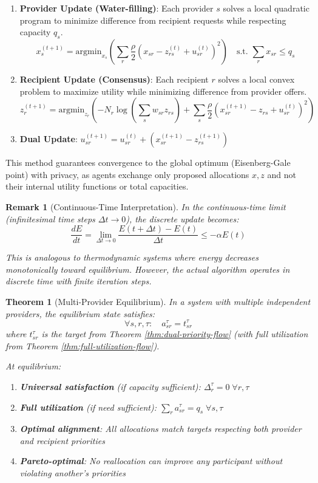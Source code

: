 \documentclass[11pt]{article}
\newtheorem{theorem}{Theorem}
\newtheorem{remark}{Remark}
\begin{document}
\begin{enumerate}
    \item \textbf{Provider Update (Water-filling)}: Each provider $s$ solves a local quadratic program to minimize difference from recipient requests while respecting capacity $q_s$.
    \[
    x_{s}^{(t+1)} = \text{argmin}_{x_s} \left( \sum_r \frac{\rho}{2} (x_{sr} - z_{rs}^{(t)} + u_{sr}^{(t)})^2 \right) \quad \text{s.t. } \sum_r x_{sr} \le q_s
    \]
    
    \item \textbf{Recipient Update (Consensus)}: Each recipient $r$ solves a local convex problem to maximize utility while minimizing difference from provider offers.
    \[
    z_{r}^{(t+1)} = \text{argmin}_{z_r} \left( -N_r \log(\sum_s w_{sr} z_{rs}) + \sum_s \frac{\rho}{2} (x_{sr}^{(t+1)} - z_{rs} + u_{sr}^{(t)})^2 \right)
    \]

    \item \textbf{Dual Update}: $u_{sr}^{(t+1)} = u_{sr}^{(t)} + (x_{sr}^{(t+1)} - z_{rs}^{(t+1)})$
\end{enumerate}

This method guarantees convergence to the global optimum (Eisenberg-Gale point) with privacy, as agents exchange only proposed allocations $x, z$ and not their internal utility functions or total capacities.

\begin{remark}[Continuous-Time Interpretation]
In the continuous-time limit (infinitesimal time steps $\Delta t \to 0$), the discrete update becomes:
\[
\frac{dE}{dt} = \lim_{\Delta t \to 0} \frac{E(t + \Delta t) - E(t)}{\Delta t} \leq -\alpha E(t)
\]

This is analogous to thermodynamic systems where energy decreases monotonically toward equilibrium. However, the actual algorithm operates in discrete time with finite iteration steps.
\end{remark}

\begin{theorem}[Multi-Provider Equilibrium]
\label{thm:multi-provider-equilibrium}
In a system with multiple independent providers, the equilibrium state satisfies:
\[
\forall s,r,\tau: \quad a_{sr}^\tau = t_{sr}^\tau
\]
where $t_{sr}^\tau$ is the target from Theorem \ref{thm:dual-priority-flow} (with full utilization from Theorem \ref{thm:full-utilization-flow}).

At equilibrium:
\begin{enumerate}
\item \textbf{Universal satisfaction} (if capacity sufficient): $\Delta_r^\tau = 0 \; \forall r,\tau$
\item \textbf{Full utilization} (if need sufficient): $\sum_r a_{sr}^\tau = q_s \; \forall s,\tau$
\item \textbf{Optimal alignment}: All allocations match targets respecting both provider and recipient priorities
\item \textbf{Pareto-optimal}: No reallocation can improve any participant without violating another's priorities
\end{enumerate}
\end{theorem}
\end{document}
